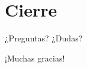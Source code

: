 \documentclass{beamer}
\begin{document}
    \section{Cierre}
    \begin{frame}
        \tableofcontents[currentsection]
    \end{frame}

    \begin{frame}
        \begin{center}
            \LARGE
            ¿Preguntas? ¿Dudas?
        \end{center}
    \end{frame}

    \begin{frame}
        \begin{center}
            \Huge
            ¡Muchas gracias!
        \end{center}
    \end{frame}
\end{document}

